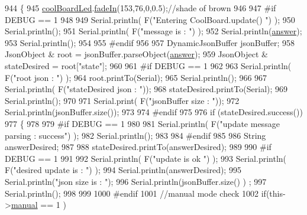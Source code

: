 \begin{DoxyCode}
944 \{
945     \hyperlink{class_cool_board_a1b1d3c684a5baa56b08486e192fd8e97}{coolBoardLed}.\hyperlink{class_cool_board_led_ab778f5e7bed0ab74e3906d82110493c3}{fadeIn}(153,76,0,0.5);\textcolor{comment}{//shade of brown        }
946 
947 \textcolor{preprocessor}{#if DEBUG == 1}
948 
949     Serial.println( F(\textcolor{stringliteral}{"Entering CoolBoard.update() "}) );
950     Serial.println();
951     Serial.println( F(\textcolor{stringliteral}{"message is : "}) );
952     Serial.println(\hyperlink{class_cool_board_a7b835fafd449e5282f7f91d787a2dc15}{answer});
953     Serial.println();
954 
955 \textcolor{preprocessor}{#endif}
956 
957     DynamicJsonBuffer jsonBuffer;
958     JsonObject & root = jsonBuffer.parseObject(\hyperlink{class_cool_board_a7b835fafd449e5282f7f91d787a2dc15}{answer});
959     JsonObject & stateDesired = root[\textcolor{stringliteral}{"state"}];
960 
961 \textcolor{preprocessor}{#if DEBUG == 1}
962 
963     Serial.println( F(\textcolor{stringliteral}{"root json : "}) );
964     root.printTo(Serial);
965     Serial.println();
966 
967     Serial.println( F(\textcolor{stringliteral}{"stateDesired json : "}));
968     stateDesired.printTo(Serial);
969     Serial.println();
970     
971     Serial.print( F(\textcolor{stringliteral}{"jsonBuffer size : "}));
972     Serial.println(jsonBuffer.size());
973 
974 \textcolor{preprocessor}{#endif}
975 
976     \textcolor{keywordflow}{if} (stateDesired.success())
977     \{
978     
979 \textcolor{preprocessor}{    #if DEBUG == 1}
980 
981         Serial.println( F(\textcolor{stringliteral}{"update message parsing : success"}) );
982         Serial.println();
983     
984 \textcolor{preprocessor}{    #endif}
985 
986             String answerDesired;
987         
988             stateDesired.printTo(answerDesired);
989             
990 \textcolor{preprocessor}{        #if DEBUG == 1      }
991         
992             Serial.println( F(\textcolor{stringliteral}{"update is ok "}) );
993             Serial.println( F(\textcolor{stringliteral}{"desired update is : "}) );            
994             Serial.println(answerDesired);
995             Serial.println(\textcolor{stringliteral}{"json size is : "});
996             Serial.println(jsonBuffer.size() ) ;                
997             Serial.println();
998 
999         
1000 \textcolor{preprocessor}{        #endif}
1001             \textcolor{comment}{//manual mode check}
1002             \textcolor{keywordflow}{if}(this->\hyperlink{class_cool_board_a7c8e505a5804b109e112d5a03df6ea2b}{manual} == 1 )

\end{DoxyCode}
